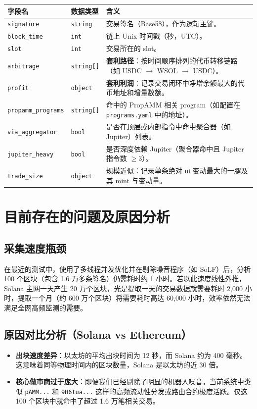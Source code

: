 \documentclass[a4paper,12pt]{article}
\begin{document}
\begin{longtable}{llp{9cm}}
\toprule
\textbf{字段名} & \textbf{数据类型} & \textbf{含义} \\
\midrule
\texttt{signature} & \texttt{string} & 交易签名（Base58），作为逻辑主键。 \\
\texttt{block\_time} & \texttt{int} & 链上 Unix 时间戳（秒，UTC）。 \\
\texttt{slot} & \texttt{int} & 交易所在的 slot。 \\
\texttt{arbitrage} & \texttt{string[]} & \textbf{套利路径}：按时间顺序排列的代币转移链路（如 USDC $\rightarrow$ WSOL $\rightarrow$ USDC）。 \\
\texttt{profit} & \texttt{object} & \textbf{套利利润}：记录交易闭环中净增余额最大的代币地址和增量数额。 \\
\texttt{propamm\_programs} & \texttt{string[]} & 命中的 PropAMM 相关 program（如配置在 \texttt{programs.yaml} 中的地址）。 \\
\texttt{via\_aggregator} & \texttt{bool} & 是否在顶层或内部指令中命中聚合器（如 Jupiter）列表。 \\
\texttt{jupiter\_heavy} & \texttt{bool} & 是否深度依赖 Jupiter（聚合器命中且 Jupiter 指令数 $\ge 3$）。 \\
\texttt{trade\_size} & \texttt{object} & 规模近似：记录单条绝对 ui 变动最大的一腿及其 mint 与变动量。 \\
\bottomrule
\end{longtable}

\section{目前存在的问题及原因分析}

\subsection{采集速度瓶颈}
在最近的测试中，使用了多线程并发优化并在剔除噪音程序（如 SoLF）后，分析 100 个区块（包含 1.6 万多条签名）仍需耗时约 1 小时。若以此速度线性外推，Solana 主网一天产生 20 万个区块，光是提取一天的交易数据就需要耗时 2,000 小时，提取一个月（约 600 万个区块）将需要耗时高达 60,000 小时，效率依然无法满足全网高频监测的需要。

\subsection{原因对比分析（Solana vs Ethereum）}
\begin{itemize}
    \item \textbf{出块速度差异}：以太坊的平均出块时间为 12 秒，而 Solana 约为 400 毫秒。这意味着同等物理时间内的区块数量，Solana 是以太坊的近 30 倍。
    \item \textbf{核心做市商过于庞大}：即便我们已经剔除了明显的机器人噪音，当前系统中类似 \texttt{pAMM...} 和 \texttt{9H6tua...} 这样的高频流动性分发或路由合约极度活跃。仅这 100 个区块中就命中了超过 1.6 万笔相关交易。
\end{itemize}
\end{document}
